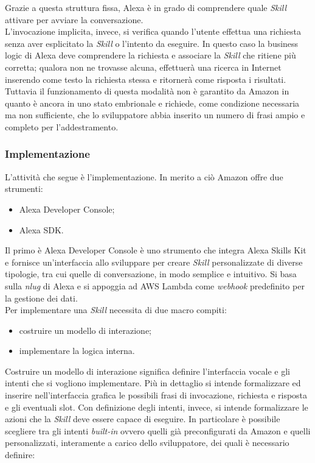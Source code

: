 		Grazie a questa struttura fissa, Alexa è in grado di comprendere quale \emph{Skill} attivare per avviare la conversazione. \\
		L'invocazione implicita, invece, si verifica quando l'utente effettua una richiesta senza aver esplicitato la \emph{Skill} o l'intento da eseguire. In questo caso la business logic di Alexa deve comprendere la richiesta e associare la \emph{Skill} che ritiene più corretta; qualora non ne trovasse alcuna, effettuerà una ricerca in Internet inserendo come testo la richiesta stessa e ritornerà come risposta i risultati. Tuttavia il funzionamento di questa modalità non è garantito da Amazon in quanto è ancora in uno stato embrionale e richiede, come condizione necessaria ma non sufficiente, che lo sviluppatore abbia inserito un numero di frasi ampio e completo per l'addestramento.
		\subsubsection{Implementazione}
		L'attività che segue è l'implementazione. In merito a ciò Amazon offre due strumenti:
		\begin{itemize}
			\item Alexa Developer Console;
			\item Alexa SDK.
		\end{itemize}
		Il primo è Alexa Developer Console è uno strumento che integra Alexa Skills Kit e fornisce un'interfaccia allo sviluppare per creare \emph{Skill} personalizzate di diverse tipologie, tra cui quelle di conversazione, in modo semplice e intuitivo. Si basa sulla \emph{\gls{nlug}} di Alexa e si appoggia ad {AWS Lambda} come \emph{webhook} predefinito per la gestione dei dati. \\
		Per implementare una \emph{Skill} necessita di due macro compiti:
		\begin{itemize}
			\item costruire un modello di interazione;
			\item implementare la logica interna.
		\end{itemize}
		Costruire un modello di interazione significa definire l'interfaccia vocale e gli intenti che si vogliono implementare. Più in dettaglio si intende formalizzare ed inserire nell'interfaccia grafica le possibili frasi di invocazione, richiesta e risposta e gli eventuali slot. Con definizione degli intenti, invece, si intende formalizzare le azioni che la \emph{Skill} deve essere capace di eseguire. In particolare è possibile scegliere tra gli intenti \emph{built-in} ovvero quelli già preconfigurati da Amazon e quelli personalizzati, interamente a carico dello sviluppatore, dei quali è necessario definire:
